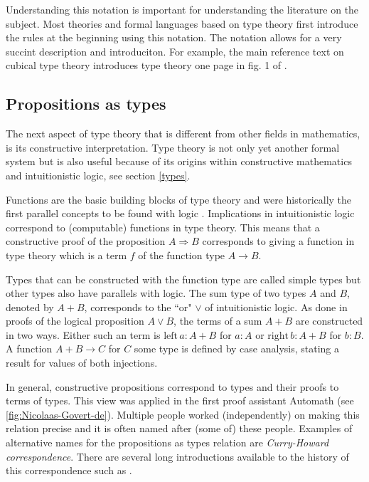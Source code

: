 \documentclass[11pt,a4paper,twoside,xetex,draft]{book}
\newcommand{\keyword}[1]{\emph{#1}\index{#1}}
\begin{document}
Understanding this notation is important for understanding the literature on the subject. Most theories and formal languages based on type theory first introduce the rules at the beginning using this notation. The notation allows for a very succint description and introduciton. For example, the main reference text on cubical type theory  introduces type theory one page in fig. 1 of \cite{Cohen2016} . 

\subsection{Propositions as types}\label{curryhoward}

The next aspect of type theory that is different from other fields in mathematics, is its constructive interpretation. Type theory is not only yet another formal system but is also useful because of its origins within constructive mathematics and intuitionistic logic, see section \cref{types}. 

Functions are the basic building blocks of type theory and were historically the first parallel concepts to be found with logic \cite{Curry1934Nov}. Implications in intuitionistic logic correspond to (computable) functions in type theory. This means that a constructive proof of the proposition $A \Rightarrow B$ corresponds to giving a function  in type theory which is a term $f$ of the function type $ A \rightarrow B$.

Types that can be constructed with the function type are called simple types but other types also have parallels with logic. The sum type of two types $A$ and $B$, denoted by $A+B$, corresponds to the ``or" $\vee$ of intuitionistic logic. As done in proofs of the logical proposition $A \vee B$, the terms of a sum $A+B$ are constructed in two ways. Either such an term is $\text{left}\,a:A+B$ for $a:A$ or $\text{right}\,b:A+B$ for $b:B$. A function $A+B\rightarrow C$ for $C$ some type is defined by case analysis, stating a result for values of both injections.

In general, constructive propositions correspond to types and their proofs to terms of types. This view was applied in the first proof assistant Automath \cite{DeBruijn1970} (see \cref{fig:Nicolaas-Govert-de}). Multiple people worked (independently) on making this relation precise and it is often named after (some of) these people. Examples of alternative names for the propositions as types relation are \keyword{Curry-Howard correspondence}. There are several long introductions available to the history of this correspondence such as \cite{BibEntry2019Apr}.
\end{document}
